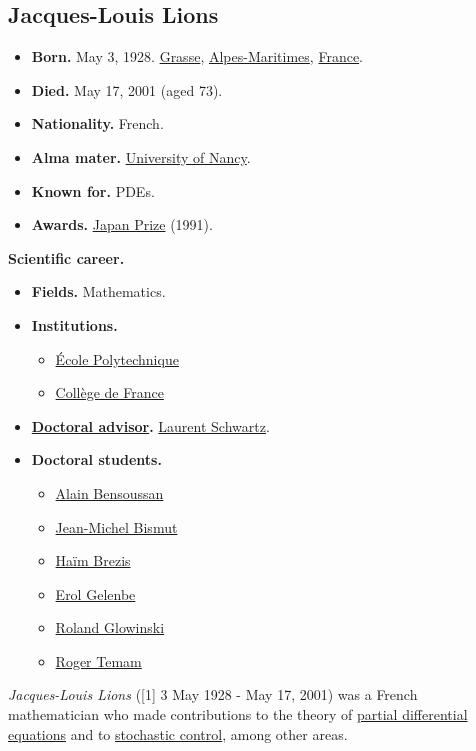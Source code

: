 \documentclass{article}
\begin{document}
\subsection{Jacques-Louis Lions}
\begin{itemize}
	\item \textbf{Born.} May 3, 1928. \href{https://en.wikipedia.org/wiki/Grasse}{Grasse}, \href{https://en.wikipedia.org/wiki/Alpes-Maritimes}{Alpes-Maritimes}, \href{https://en.wikipedia.org/wiki/France}{France}.
	\item \textbf{Died.} May 17, 2001 (aged 73).
	\item \textbf{Nationality.} French.
	\item \textbf{Alma mater.} \href{https://en.wikipedia.org/wiki/University_of_Nancy}{University of Nancy}.
	\item \textbf{Known for.} PDEs.
	\item \textbf{Awards.} \href{https://en.wikipedia.org/wiki/Japan_Prize}{Japan Prize} (1991).
\end{itemize}
\textbf{Scientific career.}
\begin{itemize}
	\item \textbf{Fields.} Mathematics.
	\item \textbf{Institutions.}
	\begin{itemize}
		\item \href{https://en.wikipedia.org/wiki/%C3%89cole_Polytechnique}{\'Ecole Polytechnique}
		\item \href{https://en.wikipedia.org/wiki/Coll%C3%A8ge_de_France}{Coll\`ege de France}
	\end{itemize}
	\item \textbf{\href{https://en.wikipedia.org/wiki/Doctoral_advisor}{Doctoral advisor}.} \href{https://en.wikipedia.org/wiki/Laurent_Schwartz}{Laurent Schwartz}.
	\item \textbf{Doctoral students.}
	\begin{itemize}
		\item \href{https://en.wikipedia.org/wiki/Alain_Bensoussan}{Alain Bensoussan}
		\item \href{https://en.wikipedia.org/wiki/Jean-Michel_Bismut}{Jean-Michel Bismut}
		\item \href{https://en.wikipedia.org/wiki/Ha%C3%AFm_Brezis}{Ha\"im Brezis}
		\item \href{https://en.wikipedia.org/wiki/Erol_Gelenbe}{Erol Gelenbe}
		\item \href{https://en.wikipedia.org/wiki/Roland_Glowinski}{Roland Glowinski}
		\item \href{https://en.wikipedia.org/wiki/Roger_Temam}{Roger Temam}
	\end{itemize}
\end{itemize}
\textit{Jacques-Louis Lions} ([1] 3 May 1928 - May 17, 2001) was a French mathematician who made contributions to the theory of \href{https://en.wikipedia.org/wiki/Partial_differential_equation}{partial differential equations} and to \href{https://en.wikipedia.org/wiki/Stochastic_processes}{stochastic control}, among other areas.
\end{document}
